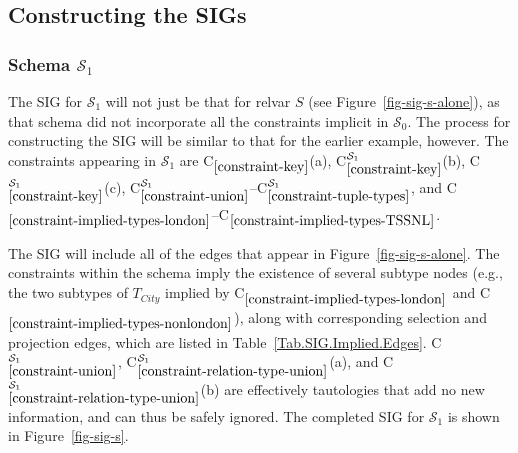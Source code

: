 \documentclass{sig-alternate-05-2015}
\newcounter{constraint}
\newcommand{\T}[1]{\ensuremath{T_{#1}}}
\newcommand{\SC}[1]{\ensuremath{\mathcal{S}_{#1}}}
\newcommand{\Constraint}[2][]{C\ensuremath{_{#2}\ifx&#1&\else^{#1}\fi}}
\begin{document}


\subsection{Constructing the SIGs}
\label{sec-date-sigs}




\subsubsection{Schema \(\SC{1}\)}
\label{sec-sigs-s-i}

\noindent The SIG for \(\SC{1}\) will not just be that for relvar \(S\) (see Figure~\ref{fig-sig-s-alone}), as that schema did not incorporate all the constraints implicit in \(\SC{0}\). The process for constructing the SIG will be similar to that for the earlier example, however. The constraints appearing in \(\SC{1}\) are \Constraint{\ref{constraint-key}}(a), \Constraint[\SC{1}]{\ref{constraint-key}}(b), \Constraint[\SC{1}]{\ref{constraint-key}}(c), \Constraint[\SC{1}]{\ref{constraint-union}}--\Constraint[\SC{1}]{\ref{constraint-tuple-types}}, and \Constraint{\ref{constraint-implied-types-london}}--\Constraint{\ref{constraint-implied-types-TSSNL}}.

The SIG will include all of the edges that appear in Figure~\ref{fig-sig-s-alone}. The constraints within the schema imply the existence of several subtype nodes (e.g., the two subtypes of \(\T{City}\) implied by \Constraint{\ref{constraint-implied-types-london}} and \Constraint{\ref{constraint-implied-types-nonlondon}}), along with corresponding selection and projection edges, which are listed in Table~\ref{Tab.SIG.Implied.Edges}. \Constraint[\SC{1}]{\ref{constraint-union}}, \Constraint[\SC{1}]{\ref{constraint-relation-type-union}}(a), and \Constraint[\SC{1}]{\ref{constraint-relation-type-union}}(b) are effectively tautologies that add no new information, and can thus be safely ignored. The completed SIG for \(\SC{1}\) is shown in Figure~\ref{fig-sig-s}.
\end{document}
